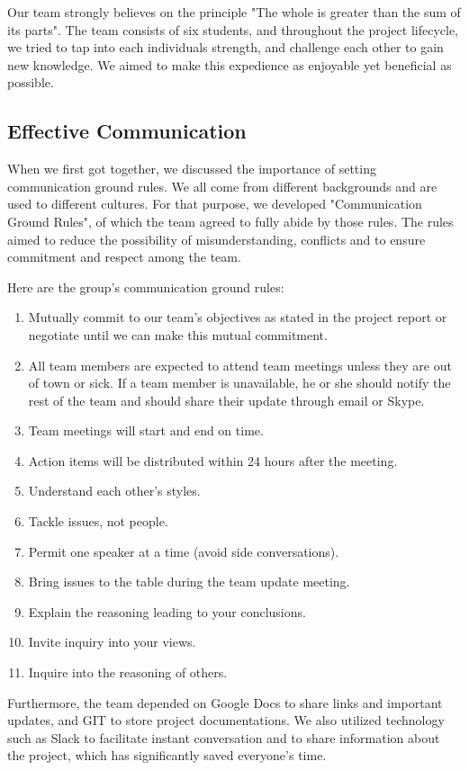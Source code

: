 \documentclass{article}
\begin{document}
Our team strongly believes on the principle "The whole is greater than the sum of its parts". The team consists of six students, and throughout the project lifecycle, we tried to tap into each individuals strength, and challenge each other to gain new knowledge. We aimed to make this expedience as enjoyable yet beneficial as possible.

\subsection{Effective Communication}
When we first got together, we discussed the importance of setting communication ground rules. We all come from different backgrounds and are used to different cultures. For that purpose, we developed "Communication Ground Rules", of which the team agreed to fully abide by those rules. The rules aimed to reduce the possibility of misunderstanding, conflicts and to ensure commitment and respect among the team.

Here are the group’s communication ground rules:
\begin{enumerate}
  \item Mutually commit to our team’s objectives as stated in the project report or negotiate until we can make this mutual commitment.
  \item All team members are expected to attend team meetings unless they are out of town or sick. If a team member is unavailable, he or she should notify the rest of the team and should share their update through email or Skype.
  \item Team meetings will start and end on time.
  \item Action items will be distributed within 24 hours after the meeting.
  \item Understand each other’s styles.
  \item Tackle issues, not people.
  \item Permit one speaker at a time (avoid side conversations).
  \item Bring issues to the table during the team update meeting.
  \item Explain the reasoning leading to your conclusions.
  \item Invite inquiry into your views.
  \item Inquire into the reasoning of others.
\end{enumerate}


Furthermore, the team depended on Google Docs to share links and important updates, and GIT to store project documentations. We also utilized technology such as Slack to facilitate instant conversation and to share information about the project, which has significantly saved everyone’s time.
\end{document}

